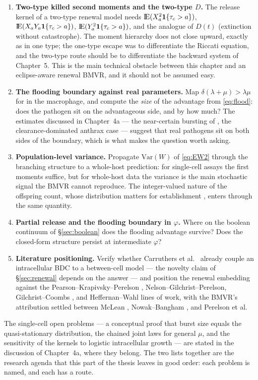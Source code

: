\begin{enumerate}
\item \textbf{Two-type killed second moments and the two-type $D$.} The
release kernel of a two-type renewal model needs
${\rm I}\!{\rm E}(X_a^2\mathbf1\{\tau_c>a\})$, ${\rm I}\!{\rm E}(X_aY_a\mathbf1\{\tau_c>a\})$,
${\rm I}\!{\rm E}(Y_a^2\mathbf1\{\tau_c>a\})$, and the analogue of $D(t)$
(extinction without catastrophe). The moment hierarchy does not close
upward, exactly as in one type; the one-type escape was to differentiate
the Riccati equation, and the two-type route should be to differentiate the
backward system of Chapter~5. This is the main technical obstacle between
this chapter and an eclipse-aware renewal BMVR, and it should not be
assumed easy.
\item \textbf{The flooding boundary against real parameters.} Map
$\delta(\lambda+\mu)>\lambda\mu$ for \yp{} in the macrophage, and compute
the \emph{size} of the advantage from \eqref{eq:flood}: does the pathogen
sit on the advantageous side, and by how much? The estimates discussed in
Chapter~4a --- the near-certain bursting of \ft{}, the clearance-dominated
anthrax case --- suggest that real pathogens sit on both sides of the
boundary, which is what makes the question worth asking.
\item \textbf{Population-level variance.} Propagate $\mathrm{Var}(W)$ of
\eqref{eq:EW2} through the branching structure to a whole-host prediction:
for single-cell assays the first moments suffice, but for whole-host data
the variance is the main stochastic signal the BMVR cannot reproduce. The
integer-valued nature of the offspring count, whose distribution matters
for establishment \cite{williams2024reproduction}, enters through the same
quantity.
\item \textbf{Partial release and the flooding boundary in $\varphi$.}
Where on the boolean continuum of \S\ref{sec:boolean} does the flooding
advantage survive? Does the closed-form structure persist at intermediate
$\varphi$?
\item \textbf{Literature positioning.} Verify whether Carruthers et al.\
\cite{carruthers2020stochastic} already couple an intracellular BDC to a
between-cell model --- the novelty claim of \S\ref{sec:renewal} depends on
the answer --- and position the renewal embedding against the
Pearson--Krapivsky--Perelson \cite{pearson2011stochastic},
Nelson--Gilchrist--Perelson, Gilchrist--Coombs
\cite{gilchrist2006evolution}, and Heffernan--Wahl lines of work, with the
BMVR's attribution settled between McLean \cite{mclean1993balance},
Nowak--Bangham \cite{nowak1996population}, and Perelson et al.
\end{enumerate}

The single-cell open problems --- a conceptual proof that burst size equals
the quasi-stationary distribution, the chained joint laws for general
$\mu$, and the sensitivity of the kernels to logistic intracellular growth
--- are stated in the discussion of Chapter~4a, where they belong. The two
lists together are the research agenda that this part of the thesis leaves
in good order: each problem is named, and each has a route.
